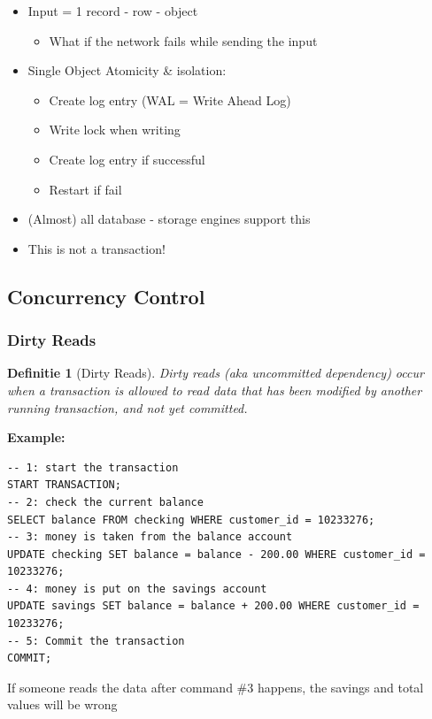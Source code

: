 \documentclass{article}
\newtheorem{theorem}{Definitie}[section]
\begin{document}
\begin{itemize}
    \item Input = 1 record - row - object
    \begin{itemize}
        \item What if the network fails while sending the input
    \end{itemize}
    \item Single Object Atomicity \& isolation:
    \begin{itemize}
        \item Create log entry (WAL = Write Ahead Log)
        \item Write lock when writing
        \item Create log entry if successful
        \item Restart if fail
    \end{itemize}
    \item (Almost) all database - storage engines support this
    \item This is not a transaction!
\end{itemize}

\subsection{Concurrency Control}

\subsubsection{Dirty Reads}

\begin{theorem}[Dirty Reads]
Dirty reads (aka uncommitted dependency) occur when a transaction is allowed 
to read data that has been modified by another running transaction, 
and not yet committed.
\end{theorem}

\textbf{Example: } 

\begin{verbatim}
-- 1: start the transaction
START TRANSACTION;
-- 2: check the current balance
SELECT balance FROM checking WHERE customer_id = 10233276;
-- 3: money is taken from the balance account
UPDATE checking SET balance = balance - 200.00 WHERE customer_id = 10233276;
-- 4: money is put on the savings account
UPDATE savings SET balance = balance + 200.00 WHERE customer_id = 10233276;
-- 5: Commit the transaction
COMMIT;
\end{verbatim}

If someone reads the data after command \#3 happens, the savings and total values will be wrong
\end{document}
